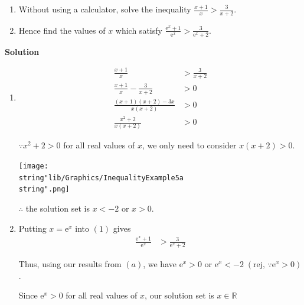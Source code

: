 \documentclass[11pt,a4paper]{book}
\newcommand{\R}{\mathbb{R}}
\begin{document}
\begin{example}
\begin{enumerate}[label=(\alph*)]

\item Without using a calculator, solve the inequality ${\displaystyle \frac{x+1}{x}>\frac{3}{x+2}}$.

\item Hence find the values of $x$ which satisfy ${\displaystyle \frac{\mathrm{e}^{x}+1}{\mathrm{e}^{x}}>\frac{3}{\mathrm{e}^{x}+2}}$.

\end{enumerate}

\textbf{\large{}Solution}{\large\par}

\begin{enumerate}[label=(\alph*)]

\item
\begin{align*}
{\displaystyle \frac{x+1}{x}} & >\frac{3}{x+2}\tag{1}\\
{\displaystyle \frac{x+1}{x}}-\frac{3}{x+2} & >0\\
\frac{\left(x+1\right)\left(x+2\right)-3x}{x\left(x+2\right)} & >0\\
\frac{x^{2}+2}{x\left(x+2\right)} & >0
\end{align*}

$\because x^{2}+2>0$ for all real values of $x$, we only need to
consider $x\left(x+2\right)>0$.
\begin{center}
\texttt{[image: \\string"lib/Graphics/InequalityExample5a\\string".png]}
\par\end{center}

$\therefore$ the solution set is $x<-2$ or $x>0$.

\item Putting $x=\mathrm{e}^{x}$ into $\left(1\right)$ gives
\begin{align*}
{\displaystyle \frac{\mathrm{e}^{x}+1}{\mathrm{e}^{x}}} & >\frac{3}{\mathrm{e}^{x}+2}
\end{align*}

Thus, using our results from $\left(a\right)$, we have $\mathrm{e}^{x}>0$
or $\mathrm{e}^{x}<-2\;(\text{rej, }\because \mathrm{e}^{x}>0)$ .

Since $\mathrm{e}^{x}>0$ for all real values of $x$, our solution set is
$x\in\R$

\end{enumerate}
\end{example}{}
\end{document}
